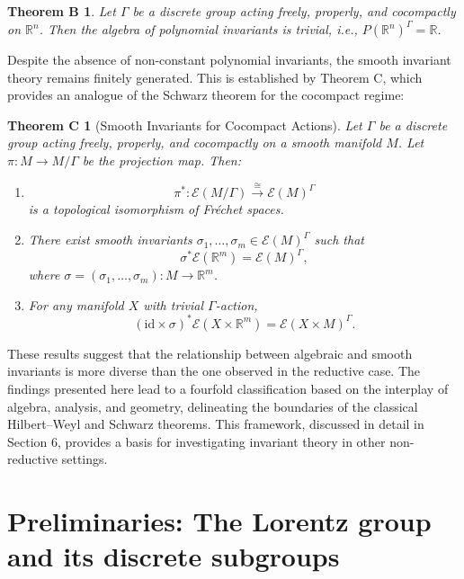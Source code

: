 \documentclass[]{article}
\newtheorem*{theoremB}{Theorem B}
\newtheorem*{theoremC}{Theorem C}
\begin{document}
\begin{theoremB}
	Let \( \Gamma \) be a discrete group acting freely, properly, and cocompactly on \( \mathbb{R}^n \). Then the algebra of polynomial invariants is trivial, i.e., \( P(\mathbb{R}^n)^\Gamma = \mathbb{R} \).
\end{theoremB}

Despite the absence of non-constant polynomial invariants, the smooth invariant theory remains finitely generated. This is established by Theorem C, which provides an analogue of the Schwarz theorem for the cocompact regime:

\begin{theoremC}[Smooth Invariants for Cocompact Actions]
	Let \( \Gamma \) be a discrete group acting freely, properly, and cocompactly on a smooth manifold \( M \). Let \( \pi: M \to M/\Gamma \) be the projection map.
	Then:
	\begin{enumerate}
		\item
		\[
		\pi^*: \mathcal{E}(M/\Gamma) \xrightarrow{\cong} \mathcal{E}(M)^\Gamma
		\]
		is a topological isomorphism of Fréchet spaces.
		\item There exist smooth invariants \( \sigma_1, \ldots, \sigma_m \in \mathcal{E}(M)^\Gamma \) such that
		\[
		\sigma^* \mathcal{E}(\mathbb{R}^m) = \mathcal{E}(M)^\Gamma,
		\]
		where \( \sigma = (\sigma_1, \ldots, \sigma_m): M \to \mathbb{R}^m \).
		\item For any manifold \( X \) with trivial \( \Gamma \)-action,
		\[
		(\mathrm{id} \times \sigma)^* \mathcal{E}(X \times \mathbb{R}^m) = \mathcal{E}(X \times M)^\Gamma.
		\]
	\end{enumerate}
	
\end{theoremC}


These results suggest that the relationship between algebraic and smooth invariants is more diverse than the one observed in the reductive case. The findings presented here lead to a fourfold classification based on the interplay of algebra, analysis, and geometry, delineating the boundaries of the classical Hilbert–Weyl and Schwarz theorems. This framework, discussed in detail in Section 6, provides a basis for investigating invariant theory in other non-reductive settings.

\section{Preliminaries: The Lorentz group and its discrete subgroups}
\end{document}
